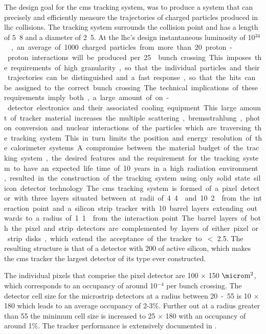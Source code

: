 The design goal for the \ac{cms} tracking system, was to produce a system that
can precisely and efficiently measure the trajectories of charged particles
produced in \ac{lhc} collisions. The tracking system surrounds the collision
point and has a length of \unit{5.8}{\meter} and a diameter of
\unit{2.5}{\meter}. At the \ac{lhc}'s design instantaneous luminosity of
\unit{10$^{34}$}{\lumiunits}, an average of 1000 charged particles from more
than 20 proton-proton interactions will be produced per \unit{25}{\nano\second}
bunch crossing. This imposes the requirements of high granularity, so that the
individual particles and their trajectories can be distinguished and a fast
response, so that the hits can be assigned to the correct bunch crossing. The
technical implications of these requirements imply both, a large amount of
on-detector electronics and their associated cooling equipment. This large
amount of tracker material increases the multiple scattering, bremsstrahlung,
photon conversion and nuclear interactions of the particles which are
traversing the tracking system. This in turn limits the position and energy
resolution of the calorimeter systems. A compromise between the material budget
of the tracking system, the desired features and the requirement for the
tracking system to have an expected life time of 10 years in a high radiation
environment, resulted in the construction of the tracking system using
only solid state silicon detector technology.

The \ac{cms} tracking system is formed of a pixel detector with three layers
situated between at radii of \unit{4.4}{\cm} and \unit{10.2}{\cm} from the interaction point
and a silicon strip tracker with 10 barrel layers extending outwards to a
radius of \unit{1.1}{\meter} from the interaction point. The barrel layers of
both the pixel and strip detectors are complemented by layers of either pixel
or strip disks, which extend the acceptance of the tracker to \mETA $<$ 2.5. The
resulting structure is that of a detector with \unit{200}{\squaremetre} of
active silicon, which makes the \ac{cms} tracker the largest detector of its
type ever constructed.

The individual pixels that comprise the pixel detector are 100 $\times$
150 $\micro\textrm{m}^{2}$, which corresponds to an occupancy of around
10$^{-4}$ per bunch crossing. The detector cell size for the microstrip
detectors at a radius between \unit{20-55}{\cm} is \unit{10}{\cm} $\times$
\unit{180}{\micro\meter} which leads to an average occupancy of 2-3$\%$.
Further out at a radius greater than \unit{55}{\cm}  the minimum cell size is
increased to \unit{25}{\cm} $\times$ \unit{180}{\micro\meter} with an occupancy
of around 1$\%$. The tracker performance is extensively documented in
\cite{cmstracking}.

